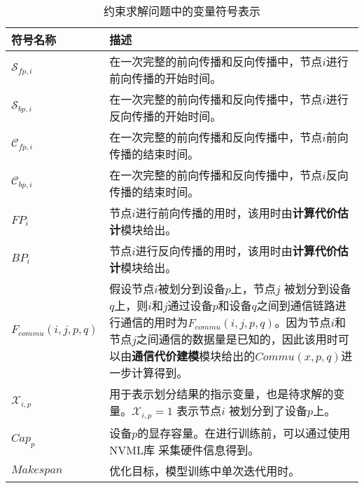 \begin{table}[h]
	\centering
	\caption{\sys{}约束求解问题中的变量符号表示}
	\label{table:symbol2}
    \begin{tabularx}{\linewidth}{p{2.8cm}  X }
        \toprule
        \textbf{符号名称} & \textbf{描述} \\
        \midrule
        $\mathcal{S}_{fp,i}$  &在一次完整的前向传播和反向传播中，节点$i$进行前向传播的开始时间。\\
        \midrule
        $\mathcal{S}_{bp,i}$ & 在一次完整的前向传播和反向传播中，节点$i$进行反向传播的开始时间。 \\
        \midrule
        $\mathcal{C}_{fp,i}$ &在一次完整的前向传播和反向传播中，节点$i$前向传播的结束时间。\\
        \midrule
        $\mathcal{C}_{bp,i}$ &在一次完整的前向传播和反向传播中，节点$i$反向传播的结束时间。\\
        \midrule
        $\mathit{FP}_i$ & 节点$i$进行前向传播的用时，该用时由\textbf{计算代价估计}模块给出。\\
        \midrule
        $\mathit{BP}_i$ & 节点$i$进行反向传播的用时，该用时由\textbf{计算代价估计}模块给出。\\
        \midrule
        $F_{\mathit{commu}}(i,j,p,q)$ & 假设节点$i$被划分到设备$p$上，节点$j$ 被划分到设备$q$上，则$i$和$j$通过设备$p$和设备$q$之间到通信链路进行通信的用时为$\mathit{F_{\mathit{commu}}}(i,j,p,q)$。因为节点$i$和节点$j$之间通信的数据量是已知的，因此该用时可以由\textbf{通信代价建模}模块给出的$\mathit{Commu}(x,p,q)$进一步计算得到。\\
        \midrule
        $\mathcal{X}_{i,p}$ & 用于表示划分结果的指示变量，也是待求解的变量。$\mathcal{X}_{i,p}=1$ 表示节点$i$ 被划分到了设备$p$上。\\
        \midrule
        $\mathit{Cap_p}$ & 设备$p$的显存容量。在进行训练前，可以通过使用NVML库 \cite{nvml}采集硬件信息得到。\\
        \midrule
        $\mathit{Makespan}$ & 优化目标，模型训练中单次迭代用时。 \\
        \bottomrule
    \end{tabularx}
\end{table}